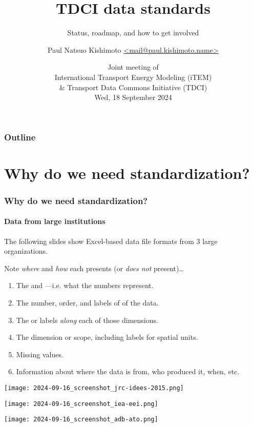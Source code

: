 \documentclass[12pt,aspectratio=169]{beamer}
\title{TDCI data standards}
\subtitle{Status, roadmap, and how to get involved}
\date{
  \texorpdfstring{Joint meeting of \\
  International Transport Energy Modeling (iTEM)\\
  \& Transport Data Commons Initiative (TDCI) \\
  Wed, 18 September 2024}%
  {2024-09-18}}
\author{\texorpdfstring{Paul Natsuo Kishimoto\scriptsize\newline
  \href{mailto:mail@paul.kishimoto.name}%
       {\ttfamily <mail@paul.kishimoto.name>}}%
  {Paul Natsuo Kishimoto <mail@paul.kishimoto.name>}}
\begin{document}
\maketitle

\begin{frame}
\frametitle{Outline}

\tableofcontents

\end{frame}

\section{Why do we need standardization?}

\begin{frame}
\frametitle{Why do we need standardization?}
\framesubtitle{Data from large institutions}

The following slides show Excel-based data file formats from 3 large organizations.

\medskip
Note \emph{where} and \emph{how} each presents (or \emph{does not} present)…
\begin{enumerate}
  \item The  and  —i.e. what the numbers represent.
  \item The number, order, and labels of  of the data.
  \item The  or labels \emph{along} each of those dimensions.
  \item The  dimension or scope, including labels for spatial units.
  \item Missing values.
  \item Information about where the data is from, who produced it, when, etc.
\end{enumerate}

\end{frame}

\begin{frame}[plain]
\hspace*{-10mm}
\texttt{[image: 2024-09-16\_screenshot\_jrc-idees-2015.png]}
\end{frame}
\begin{frame}[plain]
\hspace*{-10mm}
\texttt{[image: 2024-09-16\_screenshot\_iea-eei.png]}
\end{frame}
\begin{frame}[plain]
\hspace*{-10mm}
\texttt{[image: 2024-09-16\_screenshot\_adb-ato.png]}
\end{frame}
\end{document}
